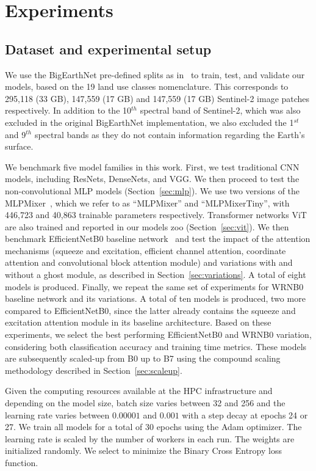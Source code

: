 \documentclass[journal]{IEEEtran}
\begin{document}
\section{Experiments}
\subsection{Dataset and experimental setup}
We use the BigEarthNet pre-defined splits as in~\cite{9552024} to train, test, and validate our models, based on the 19 land use classes nomenclature. This corresponds to 295,118 (33 GB), 147,559 (17 GB) and 147,559  (17 GB) Sentinel-2 image patches respectively. In addition to the 10$^{th}$ spectral band of Sentinel-2, which was also excluded in the original BigEarthNet implementation, we also excluded the 1$^{st}$ and 9$^{th}$ spectral bands as they do not contain information regarding the Earth’s surface.

We benchmark five model families in this work. First, we test traditional CNN models, including ResNets, DenseNets, and VGG. We then proceed to test the non-convolutional MLP models (Section~\ref{sec:mlp}). We use two versions of the MLPMixer~\citep{tolstikhin2021mlpmixer}, which we refer to as ``MLPMixer'' and ``MLPMixerTiny'', with 446,723 and 40,863 trainable parameters respectively. Transformer networks ViT~\citep{DBLP:journals/corr/abs-2010-11929}
are also trained and reported in our models zoo (Section~\ref{sec:vit}). We then benchmark EfficientNetB0 baseline network~\citep{pmlr-v97-tan19a} and test the impact of the attention mechanisms (squeeze and excitation, efficient channel attention, coordinate attention and convolutional block attention module) and variations with and without a ghost module, as described in Section~\ref{sec:variations}. A total of eight models is produced. Finally, we repeat the same set of experiments for WRNB0 baseline network and its variations. A total of ten models is produced, two more compared to EfficientNetB0, since the latter already contains the squeeze and excitation attention module in its baseline architecture. Based on these experiments, we select the best performing EfficientNetB0 and WRNB0 variation, considering both classification accuracy and training time metrics. These models are subsequently scaled-up from B0 up to B7 using the compound scaling methodology described in Section~\ref{sec:scaleup}. 

Given the computing resources available at the HPC infrastructure and depending on the model size, batch size varies between 32 and 256 and the learning rate varies between $0.00001$ and $0.001$ with a step decay at epochs 24 or 27. We train all models for a total of 30 epochs using the Adam optimizer. The learning rate is scaled by the number of workers in each run. The weights are initialized randomly. We select to minimize the Binary Cross Entropy loss function.
\end{document}
